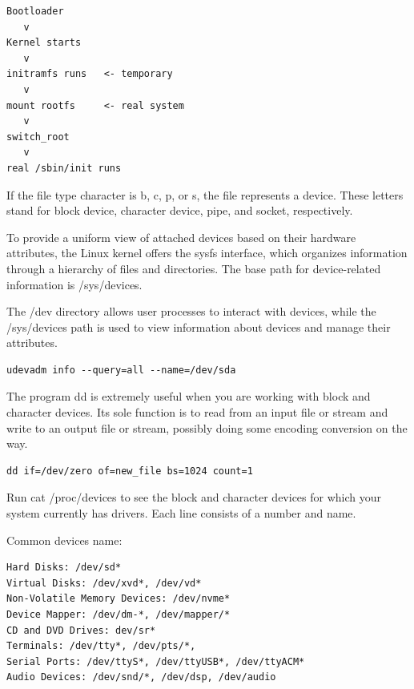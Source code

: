 \documentclass[paper=8.5in:11in, twoside, 12pt, pagesize=pdftex]{book}
\begin{document}
\begin{lstlisting}
Bootloader
   v
Kernel starts
   v
initramfs runs   <- temporary
   v
mount rootfs     <- real system
   v
switch_root
   v
real /sbin/init runs
\end{lstlisting}

	\par If the file type character is b, c, p, or s, the file represents a device. These letters stand for block device, character device, pipe, and socket, respectively.

	\par To provide a uniform view of attached devices based on their hardware attributes, the Linux kernel offers the sysfs interface, which organizes information through a hierarchy of files and directories. The base path for device-related information is /sys/devices.

	\par The /dev directory allows user processes to interact with devices, while the /sys/devices path is used to view information about devices and manage their attributes.

\begin{lstlisting}
udevadm info --query=all --name=/dev/sda
\end{lstlisting}

	\par The program dd is extremely useful when you are working with block and character devices. Its sole function is to read from an input file or stream and write to an output file or stream, possibly doing some encoding conversion on the way.

\begin{lstlisting}
dd if=/dev/zero of=new_file bs=1024 count=1
\end{lstlisting}

	\par Run cat /proc/devices to see the block and character devices for which your system currently has drivers. Each line consists of a number and name.

	\par Common devices name:
\begin{lstlisting}
Hard Disks: /dev/sd*
Virtual Disks: /dev/xvd*, /dev/vd*
Non-Volatile Memory Devices: /dev/nvme*
Device Mapper: /dev/dm-*, /dev/mapper/*
CD and DVD Drives: dev/sr*
Terminals: /dev/tty*, /dev/pts/*,
Serial Ports: /dev/ttyS*, /dev/ttyUSB*, /dev/ttyACM*
Audio Devices: /dev/snd/*, /dev/dsp, /dev/audio
\end{lstlisting}
\end{document}

